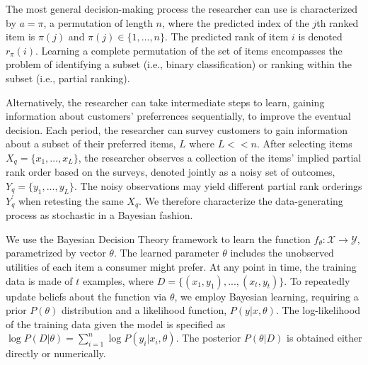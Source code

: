 \documentclass[nonblindrev]{informs3}
\newcommand{\numitems}{n}
\newcommand{\numperset}{L}
\begin{document}
The most general decision-making process the researcher can use is characterized by $a=\pi$, a permutation of length $\numitems$, where the predicted index of the $j$th ranked item is $\pi(j)$ and $\pi(j) \in \{1,\ldots,\numitems\}$. The predicted rank of item $i$ is denoted $r_\pi(i)$. Learning a complete permutation of the set of items encompasses the problem of identifying a subset (i.e., binary classification) or ranking within the subset (i.e., partial ranking). 

Alternatively, the researcher can take intermediate steps to learn, gaining information about customers' preferrences sequentially, to improve the eventual decision. Each period, the researcher can survey customers to gain information about a subset of their preferred items, $\numperset$ where $\numperset << \numitems$. After selecting items $X_q = \{ x_1,\ldots, x_\numperset \}$, the researcher observes a collection of the items' implied partial rank order based on the surveys, denoted jointly as a noisy set of outcomes, $Y_q = \{ y_1,\ldots, y_\numperset \}$. The noisy observations may yield different partial rank orderings $Y_q^{'}$ when retesting the same $X_q$. We therefore characterize the data-generating process as stochastic in a Bayesian fashion. 

%

We use the Bayesian Decision Theory framework to learn the function $f_\theta: \mathcal{X} \to \mathcal{Y}$, parametrized by vector $\theta$. The learned parameter $\theta$ includes the unobserved utilities of each item a consumer might prefer. At any point in time, the training data is made of $t$ examples, where $D = \{ (x_1,y_1),...,(x_t,y_t) \}$. To repeatedly update beliefs about the function via $\theta$, we employ Bayesian learning, requiring a prior $P(\theta)$ distribution and a likelihood function, $P(y|x,\theta)$. The log-likelihood of the training data given the model is specified as $\log P(D|\theta) = \sum_{i=1}^n \log P(y_i|x_i,\theta)$. The posterior $P(\theta|D)$ is obtained either directly or numerically.
\end{document}
